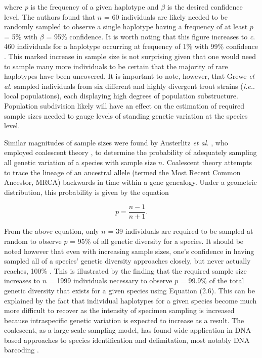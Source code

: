 \noindent where \textit{p} is the frequency of a given haplotype and $\beta$ is the desired confidence level. The authors found that $n$ = 60 individuals are likely needed to be randomly sampled to observe a single haplotype having a frequency of at least $p$ = 5\% with $\beta$ = 95\% confidence. It is worth noting that this figure increases to \textit{c}. 460 individuals for a haplotype occurring at frequency of 1\% with 99\% confidence \cite{grewe1993mitochondrial}. This marked increase in sample size is not surprising given that one would need to sample many more individuals to be certain that the majority of rare haplotypes have been uncovered. It is important to note, however, that Grewe \textit{et al.} \cite{grewe1993mitochondrial} sampled individuals from six different and highly divergent trout strains (\textit{i.e.}. local populations), each displaying high degrees of population substructure. Population subdivision likely will have an effect on the estimation of required sample sizes needed to gauge levels of standing genetic variation at the species level. 



Similar magnitudes of sample sizes were found by Austerlitz \textit{et al.} \cite{austerlitz2009dna}, who employed coalescent theory \cite{kingman1982coalescent}, to determine the probability of adequately sampling all genetic variation of a species with sample size $n$. Coalescent theory attempts to trace the lineage of an ancestral allele (termed the Most Recent Common Ancestor, MRCA) backwards in time within a gene genealogy. Under a geometric distribution, this probability is given by the equation \cite{austerlitz2009dna}

\begin{equation}
p = \frac{n - 1}{n + 1}.
\end{equation}



\noindent From the above equation, only $n$ = 39 individuals are required to be sampled at random to observe $p$ = 95\% of all genetic diversity for a species. It should be noted however that even with increasing sample sizes, one's confidence in having sampled all of a species’ genetic diversity approaches closely, but never actually reaches, 100\% \cite{austerlitz2009dna}. This is illustrated by the finding that the required sample size increases to $n$ = 1999 individuals necessary to observe $p$ = 99.9\% of the total genetic diversity that exists for a given species using Equation (2.6). This can be explained by the fact that individual haplotypes for a given species become much more difficult to recover as the intensity of specimen sampling is increased because intraspecific genetic variation is expected to increase as a result. The coalescent, as a large-scale sampling model, has found wide application in DNA-based approaches to species identification and delimitation, most notably DNA barcoding \cite{hubert2015dna}.



